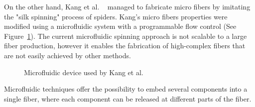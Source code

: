 On the other hand, Kang et al. \unskip~\cite{527120:13656548} managed to fabricate micro fibers by imitating the "silk spinning" process of spiders. Kang's micro fibers properties were modified using a microfluidic system with a programmable flow control (See Figure~\ref{f-c0beae2757bf}). The current microfluidic spinning approach is not scalable to a large fiber production, however it enables the fabrication of high-complex fibers that are not easily achieved by other methods.


\bgroup
\begin{figure}[!htbp]
\centering \makeatletter{}
\makeatother 
\caption{{Microfluidic device used by Kang et al.\unskip~\protect\cite{527120:13656548}}}
\label{f-c0beae2757bf}
\end{figure}
\egroup
Microfluidic techniques offer the possibility to embed several components into a single fiber, where each component can be released at different parts of the fiber. 



